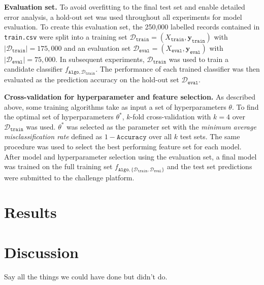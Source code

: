 \documentclass[10pt,conference,compsocconf]{IEEEtran}
\newcommand{\parabf}[1]{\vspace{1mm}\noindent\textbf{#1}}
\newcommand{\Deval}{\mathcal{D}_{\mathtt{eval}}}
\newcommand{\Dtrain}{\mathcal{D}_{\mathtt{train}}}
\newcommand{\Xtrain}{X_{\mathtt{train}}}
\newcommand{\ytrain}{\mathbf{y}_{\mathtt{train}}}
\newcommand{\Xeval}{X_{\mathtt{eval}}}
\newcommand{\yeval}{\mathbf{y}_{\mathtt{eval}}}
\newcommand{\classifier}[2]{f_{#1, #2}}
\newcommand{\Train}{\mathtt{Algo}}
\begin{document}
\parabf{Evaluation set.} To avoid overfitting to the final test set and enable detailed error analysis, a hold-out set was used throughout all experiments for model evaluation. To create this evaluation set, the 250,000 labelled records contained in \texttt{train.csv} were split into a training set $\Dtrain = (\Xtrain, \ytrain)$ with $|\Dtrain| = 175,000$ and an evaluation set $\Deval = (\Xeval, \yeval)$ with $|\Deval| = 75,000$. In subsequent experiments, $\Dtrain$ was used to train a candidate classifier $\classifier{\Train}{\Dtrain}$. The performance of each trained classifier was then evaluated as the prediction accuracy on the hold-out set $\Deval$.

\parabf{Cross-validation for hyperparameter and feature selection.} As described above, some training algorithms take as input a set of hyperparameters $\theta$. To find the optimal set of hyperparameters $\theta^*$, $k$-fold cross-validation with $k=4$ over $\Dtrain$ was used. $\theta^*$ was selected as the parameter set with the \emph{minimum average misclassification rate} defined as $1 - \mathtt{Accuracy}$ over all $k$ test sets. The same procedure was used to select the best performing feature set for each model.\\

After model and hyperparameter selection using the evaluation set, a final model was trained on the full training set
$\classifier{\Train}{\{ \Dtrain, \Deval\}}$ and the test set predictions were submitted to the challenge platform. 

\section{Results}
\label{sec:results}

\section{Discussion}
Say all the things we could have done but didn't do.



\end{document}
